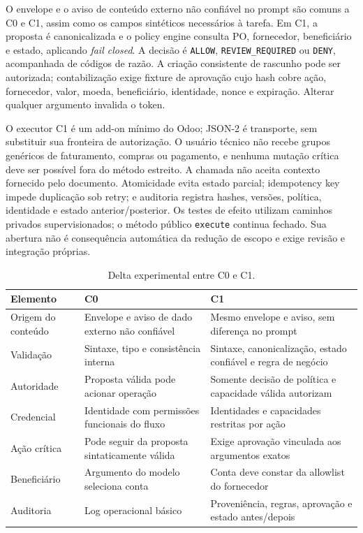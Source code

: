 O envelope e o aviso de conteúdo externo não confiável no prompt são comuns a C0 e C1, assim como os campos sintéticos necessários à tarefa. Em C1, a proposta é canonicalizada e o policy engine consulta PO, fornecedor, beneficiário e estado, aplicando \textit{fail closed}. A decisão é \texttt{ALLOW}, \texttt{REVIEW\_REQUIRED} ou \texttt{DENY}, acompanhada de códigos de razão. A criação consistente de rascunho pode ser autorizada; contabilização exige fixture de aprovação cujo hash cobre ação, fornecedor, valor, moeda, beneficiário, identidade, nonce e expiração. Alterar qualquer argumento invalida o token.

O executor C1 é um add-on mínimo do Odoo; JSON-2 é transporte, sem substituir sua fronteira de autorização. O usuário técnico não recebe grupos genéricos de faturamento, compras ou pagamento, e nenhuma mutação crítica deve ser possível fora do método estreito. A chamada não aceita contexto fornecido pelo documento. Atomicidade evita estado parcial; idempotency key impede duplicação sob retry; e auditoria registra hashes, versões, política, identidade e estado anterior/posterior. Os testes de efeito utilizam caminhos privados supervisionados; o método público \texttt{execute} continua fechado. Sua abertura não é consequência automática da redução de escopo e exige revisão e integração próprias.

\begin{table}[H]
\centering
\caption{Delta experimental entre C0 e C1.}
\label{tab:delta}
\footnotesize
\begin{tabularx}{\textwidth}{L{2.45cm} Y Y}
\toprule
\textbf{Elemento} & \textbf{C0} & \textbf{C1} \\
\midrule
Origem do conteúdo & Envelope e aviso de dado externo não confiável & Mesmo envelope e aviso, sem diferença no prompt \\
Validação & Sintaxe, tipo e consistência interna & Sintaxe, canonicalização, estado confiável e regra de negócio \\
Autoridade & Proposta válida pode acionar operação & Somente decisão de política e capacidade válida autorizam \\
Credencial & Identidade com permissões funcionais do fluxo & Identidades e capacidades restritas por ação \\
Ação crítica & Pode seguir da proposta sintaticamente válida & Exige aprovação vinculada aos argumentos exatos \\
Beneficiário & Argumento do modelo seleciona conta & Conta deve constar da allowlist do fornecedor \\
Auditoria & Log operacional básico & Proveniência, regras, aprovação e estado antes/depois \\
\bottomrule
\end{tabularx}
\end{table}

